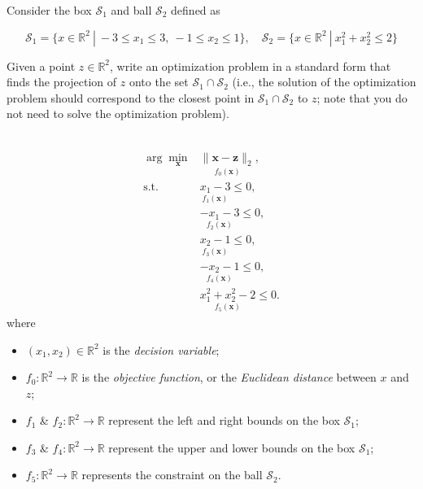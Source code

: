 \begin{homeworkProblem}
    
    Consider the  box $\mathcal S_1$ and ball $\mathcal S_2$ defined as
    
    \begin{equation}
        \mathcal S_1=\{x\in\mathbb R^2 \ |\ -3\leq x_1\leq 3,\ -1\leq x_2\leq 1\},\quad \mathcal S_2=\{x\in\mathbb R^2 \ |\  x_1^2+x_2^2\leq 2\}
    \end{equation}
    
    Given a point $z\in\mathbb R^2$, write an optimization problem in a standard 
    form that finds the projection of $z$ onto the set $\mathcal S_1\cap \mathcal S_2$ 
    (i.e., the solution of the optimization problem should correspond to the closest 
    point in $\mathcal S_1\cap \mathcal S_2$ to $z$; note that you do not need to 
    solve the optimization problem).
    \\ \\ 
    \begin{solution}
        \[
            \begin{array}{rl}
            \arg\min\limits_{\boldsymbol{x}} & \underset{f_0(\boldsymbol{x})}{\boxed{\|\boldsymbol{x}-\boldsymbol{z}\|_2}}, \\ [3ex]
            \text{s.t.} & \underset{f_1(\boldsymbol{x})}{\boxed{x_1 - 3}} \leq 0, \\ [3ex]
                        & \underset{f_2(\boldsymbol{x})}{\boxed{-x_1 - 3}} \leq 0, \\ [3ex]
                        & \underset{f_3(\boldsymbol{x})}{\boxed{x_2 - 1}} \leq 0, \\ [3ex]
                        & \underset{f_4(\boldsymbol{x})}{\boxed{-x_2 - 1}} \leq 0, \\ [3ex]
                        & \underset{f_5(\boldsymbol{x})}{\boxed{x_1^2 + x_2^2 - 2}} \leq 0.
            \end{array}
        \]
        where
        \begin{itemize}
            \item $(x_1, x_2) \in \mathbb{R}^2$ is the \textit{decision variable};
            \item $f_0 : \mathbb{R}^2 \to \mathbb{R}$ is the \textit{objective function}, or the \textit{Euclidean distance} between $x$ and $z$;
            \item $f_1$ \& $f_2 : \mathbb{R}^2 \to \mathbb{R}$ represent the left and right bounds on the box $\mathcal{S}_1$;
            \item $f_3$ \& $f_4 : \mathbb{R}^2 \to \mathbb{R}$ represent the upper and lower bounds on the box $\mathcal{S}_1$;
            \item $f_5 : \mathbb{R}^2 \to \mathbb{R}$ represents the constraint on the ball $\mathcal{S}_2$.
        \end{itemize}

    \end{solution}

\end{homeworkProblem}


